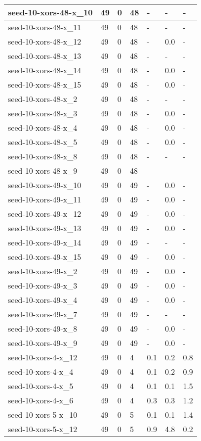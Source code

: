 \begin{scriptsize}
\begin{longtable}{|p{5cm}|l|l|l|l|l|l|}
seed-10-xors-48-x\_10&49&0&48&-&-&- \\ \hline 
seed-10-xors-48-x\_11&49&0&48&-&-&- \\ \hline 
seed-10-xors-48-x\_12&49&0&48&-&0.0&- \\ \hline 
seed-10-xors-48-x\_13&49&0&48&-&-&- \\ \hline 
seed-10-xors-48-x\_14&49&0&48&-&0.0&- \\ \hline 
seed-10-xors-48-x\_15&49&0&48&-&0.0&- \\ \hline 
seed-10-xors-48-x\_2&49&0&48&-&-&- \\ \hline 
seed-10-xors-48-x\_3&49&0&48&-&0.0&- \\ \hline 
seed-10-xors-48-x\_4&49&0&48&-&0.0&- \\ \hline 
seed-10-xors-48-x\_5&49&0&48&-&0.0&- \\ \hline 
seed-10-xors-48-x\_8&49&0&48&-&-&- \\ \hline 
seed-10-xors-48-x\_9&49&0&48&-&-&- \\ \hline 
seed-10-xors-49-x\_10&49&0&49&-&0.0&- \\ \hline 
seed-10-xors-49-x\_11&49&0&49&-&0.0&- \\ \hline 
seed-10-xors-49-x\_12&49&0&49&-&0.0&- \\ \hline 
seed-10-xors-49-x\_13&49&0&49&-&0.0&- \\ \hline 
seed-10-xors-49-x\_14&49&0&49&-&-&- \\ \hline 
seed-10-xors-49-x\_15&49&0&49&-&0.0&- \\ \hline 
seed-10-xors-49-x\_2&49&0&49&-&0.0&- \\ \hline 
seed-10-xors-49-x\_3&49&0&49&-&0.0&- \\ \hline 
seed-10-xors-49-x\_4&49&0&49&-&0.0&- \\ \hline 
seed-10-xors-49-x\_7&49&0&49&-&-&- \\ \hline 
seed-10-xors-49-x\_8&49&0&49&-&0.0&- \\ \hline 
seed-10-xors-49-x\_9&49&0&49&-&0.0&- \\ \hline 
seed-10-xors-4-x\_12&49&0&4&0.1&0.2&0.8 \\ \hline 
seed-10-xors-4-x\_4&49&0&4&0.1&0.2&0.9 \\ \hline 
seed-10-xors-4-x\_5&49&0&4&0.1&0.1&1.5 \\ \hline 
seed-10-xors-4-x\_6&49&0&4&0.3&0.3&1.2 \\ \hline 
seed-10-xors-5-x\_10&49&0&5&0.1&0.1&1.4 \\ \hline 
seed-10-xors-5-x\_12&49&0&5&0.9&4.8&0.2 \\ \hline 

\end{longtable}
\end{scriptsize}
